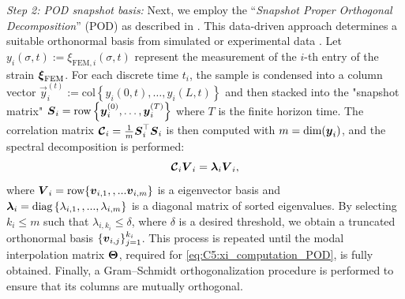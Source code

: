 \textit{Step 2: POD snapshot basis:} Next, we employ the ``\textit{Snapshot Proper Orthogonal Decomposition}'' (POD) as described in \cite{Duriez2016,Goury2018}. This data-driven approach determines a suitable orthonormal basis from simulated or experimental data \cite{Astrid2008}. Let $y_{i}(\sigma,t) := \xi_{\textrm{FEM},i}(\sigma,t)$ represent the measurement of the $i$-th entry of the strain ${\boldsymbol{\xi}}_{\textrm{FEM}}$. For each discrete time $t_i$, the sample is condensed into a column vector $\vec{y}_i^{(t)} := \textrm{col}\left\{y_i(0,t),\dots,y_i(L,t) \right\}$ and then stacked into the "snapshot matrix" $\boldsymbol{S}_i = \textrm{row}\left\{ \boldsymbol{y}_i^{(0)},\dots,\boldsymbol{y}_i^{(T)} \right\}$ where $T$ is the finite horizon time. The correlation matrix $\boldsymbol{\mathcal{C}}_i = \tfrac{1}{m} \boldsymbol{S}_i^\top \boldsymbol{S}_i$ is then computed with $m = \text{dim}({\boldsymbol{y}}_i)$, and the spectral decomposition is performed:
%
\begin{equation}
\boldsymbol{\mathcal{C}}_i {\boldsymbol{V}}_i = \boldsymbol{\lambda}_i {\boldsymbol{V}}_i,
\end{equation}
%
where ${\boldsymbol{V}}_i = \textrm{row}\{{\boldsymbol{v}}_{i,1},,...{\boldsymbol{v}}_{i,m}\}$ is a eigenvector basis and $\boldsymbol{\lambda}_i = \textnormal{diag}\left\{ {\lambda_{i,1},,...,\lambda_{i,m}} \right\}$ is a diagonal matrix of sorted eigenvalues. By selecting $k_i \le m$ such that $\lambda_{i,k_i} \le \delta$, where $\delta$ is a desired threshold, we obtain a truncated orthonormal basis $\{{\boldsymbol{v}}_{i,j}\}_{j=1}^{k_i}$. This process is repeated until the modal interpolation matrix ${\boldsymbol{\Theta}}$, required for \eqref{eq:C5:xi_computation_POD}, is fully obtained. Finally, a Gram–Schmidt orthogonalization procedure is performed to ensure that its columns are mutually orthogonal. \\

